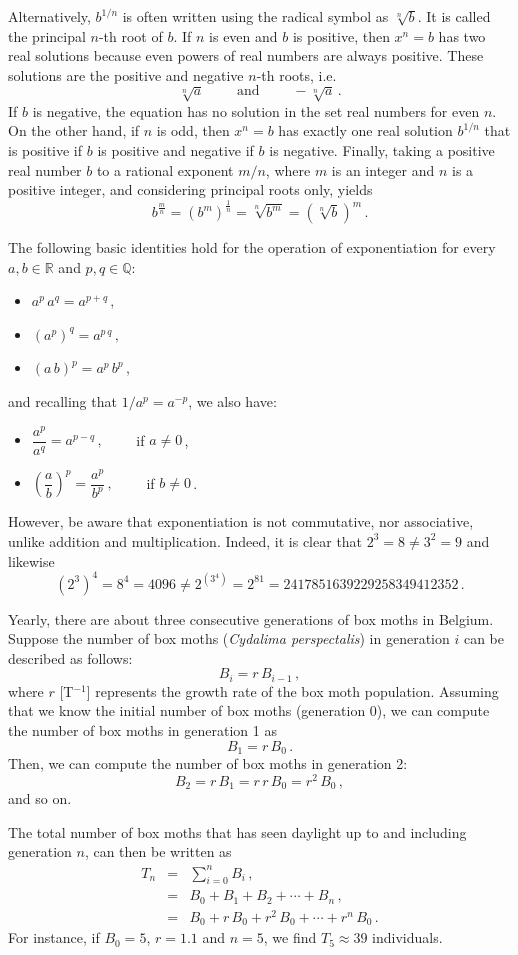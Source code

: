 Alternatively, $b^{1/n}$ is often written using the radical symbol as $\sqrt[n]{b}$. It is called the principal $n$-th root of $b$. If $n$ is even and $b$ is positive, then $x^n = b$ has two real solutions because even powers of real numbers are always positive. These solutions are the positive and negative $n$-th roots, i.e.
$$
\sqrt[n]{a}\qquad \mbox{ and }\qquad -\sqrt[n]{a}\,. 
$$
If $b$ is negative, the equation has no solution in the set real numbers for even $n$. On the other hand, if $n$ is odd, then $x^n = b$ has exactly one real solution $b^{1/n}$ that is positive if $b$ is positive and negative if $b$ is negative. Finally, taking a positive real number $b$ to a rational exponent $m/n$, where $m$ is an integer and $n$ is a positive integer, and considering principal roots only, yields
$$
b^{\frac{m}{n}}=\left(b^m\right)^{\frac{1}{n}}=\sqrt[n]{b^m}=\left(\sqrt[n]{b}\right)^m\,.
$$

The following basic identities hold for the operation of exponentiation for every $a,b\in\mathbb{R}$ and $p,q\in\mathbb{Q}$:
\begin{itemize}
	\item $a^p\, a^q=a^{p+q}\,,$
	\item $\left(a^p\right)^q=a^{p\, q}\,,$
	\item $\left(a\, b\right)^p=a^p\, b^p\,,$
\end{itemize}
and recalling that $1/a^p=a^{-p}$, we also have:
\begin{itemize}
	\item $\dfrac{a^p}{a^q}=a^{p-q}\,,\qquad$ if $a\neq 0$\,,
	\item $\left(\dfrac{a}{b}\right)^p=\dfrac{a^p}{b^p}\,,\qquad$ if $b\neq 0$\,.
\end{itemize}
However, be aware that exponentiation is not commutative, nor associative, unlike addition and multiplication. Indeed, it is clear that $2^3=8\neq3^2=9$ and likewise 
$$
\left(2^3\right)^4=8^4=4096\neq 2^{(3^4)}=2^{81}=2417851639229258349412352\,.
$$


\begin{example}
	Yearly, there are about three consecutive generations of box moths in Belgium. Suppose the number of box moths (\textit{Cydalima perspectalis}) in generation $i$ can be described as follows:
	$$
	B_{i}=r\,B_{i-1}\,,
	$$
	where $r$ [T$^{-1}$] represents the growth rate of the box moth population. Assuming that we know the initial number of box moths (generation 0), we can compute the number of box moths in generation 1 as
	$$
	B_1=r\,B_0\,.
	$$
	Then, we can compute the number of box moths in generation 2:
	$$
	B_2=r\,B_1=r\,r\,B_0=r^2\,B_0\,,
	$$
	and so on. 
	
	The total number of box moths that has seen daylight up to and including generation $n$, can then be written as
	\begin{eqnarray*}
		T_n&=&\displaystyle\sum_{i=0}^nB_i\,,\\
		&=&B_0+B_1+B_2+\cdots+B_n\,,\\
		&=&B_0+r\,B_0+r^2\,B_0+\cdots+r^n\,B_0\,.
	\end{eqnarray*}
	For instance, if $B_0=5$, $r=1.1$ and $n=5$, we find $T_5\approx39$ individuals. 
\end{example}

